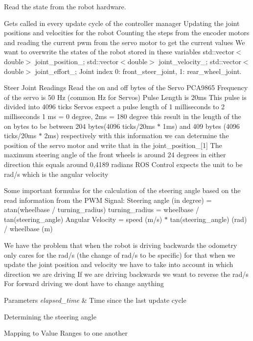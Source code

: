 Read the state from the robot hardware. 

Gets called in every update cycle of the controller manager Updating the joint positions and velocities for the robot Counting the steps from the encoder motors and reading the current pwm from the servo motor to get the current values We want to overwrite the states of the robot stored in these variables std\+::vector$<$double$>$ joint\+\_\+position\+\_\+; std\+::vector$<$double$>$ joint\+\_\+velocity\+\_\+; std\+::vector$<$double$>$ joint\+\_\+effort\+\_\+; Joint index 0\+: front\+\_\+steer\+\_\+joint, 1\+: rear\+\_\+wheel\+\_\+joint.

Steer Joint Readings Read the on and off bytes of the Servo P\+C\+A9865 Frequency of the servo is 50 Hz (common Hz for Servos) Pulse Length is 20ms This pulse is divided into 4096 ticks Servos expect a pulse length of 1 milliseconds to 2 milliseconds 1 ms = 0 degree, 2ms = 180 degree this result in the length of the on bytes to be between 204 bytes(4096 ticks/20ms $\ast$ 1ms) and 409 bytes (4096 ticks/20ms $\ast$ 2ms) respectively with this information we can determine the position of the servo motor and write that in the joint\+\_\+position\+\_\+\mbox{[}1\mbox{]} The maximum steering angle of the front wheels is around 24 degrees in either direction this equals around 0,4189 radians R\+OS Control expects the unit to be rad/s which is the angular velocity

Some important formulas for the calculation of the steering angle based on the read information from the P\+WM Signal\+: Steering angle (in degree) = atan(wheelbase / turning\+\_\+radius) turning\+\_\+radius = wheelbase / tan(steering\+\_\+angle) Angular Velocity = speed (m/s) $\ast$ tan(steering\+\_\+angle) (rad) / wheelbase (m)

We have the problem that when the robot is driving backwards the odometry only cares for the rad/s (the change of rad/s to be specific) for that when we update the joint position and velocity we have to take into account in which direction we are driving If we are driving backwards we want to reverse the rad/s For forward driving we dont have to change anything


\begin{DoxyParams}{Parameters}
{\em elapsed\+\_\+time} & Time since the last update cycle \\
\hline
\end{DoxyParams}
Determining the steering angle

Mapping to Value Ranges to one another\mbox{\label{classfennec__ns_1_1_fennec_h_w_interface_a0b68acf47d161d3c7d30d21b35327923}} 

